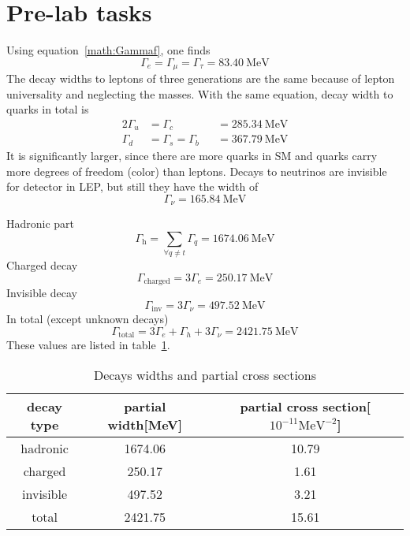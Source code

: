 \section{Pre-lab tasks}
Using equation~\ref{math:Gammaf}, one finds
\begin{equation}
	\Gamma_e = \Gamma_\mu = \Gamma_\tau = \SI{83.40}{\mega\eV}
\end{equation}
The decay widths to leptons of three generations are the same because of lepton universality and neglecting the masses. With the same equation, decay width to quarks in total is
\begin{alignat*}{2}
	\Gamma_u &= \Gamma_c &&= \SI{285.34}{\mega\eV} \\
	\Gamma_d &= \Gamma_s = \Gamma_b &&= \SI{367.79}{\mega\eV}
\end{alignat*}
It is significantly larger, since there are more quarks in SM and quarks carry more degrees of freedom (color) than leptons. Decays to neutrinos are invisible for detector in LEP, but still they have the width of
\begin{equation}
	\Gamma_{\nu} = \SI{165.84}{\mega\eV}
	\label{math:Gammanu}
\end{equation}

Hadronic part
\begin{equation}
	\Gamma_\text{h} = \sum_{\forall q\neq t} \Gamma_q = \SI{1674.06}{\mega\eV}
\end{equation}
Charged decay
\begin{equation}
	\Gamma_\text{charged} = 3 \Gamma_e = \SI{250.17}{\mega\eV}
\end{equation}
Invisible decay
\begin{equation}
	\Gamma_\text{inv} = 3\Gamma_\nu = \SI{497.52}{\mega\eV}
\end{equation}
In total (except unknown decays)
\begin{equation}
	\Gamma_\text{total} = 3\Gamma_e + \Gamma_h + 3\Gamma_\nu = \SI{2421.75}{\mega\eV}
\end{equation}
These values are listed in table~\ref{tab:p_cross_theo}.
\begin{table}[ht]
	\centering
	\begin{tabular}{ccc}
		\toprule
		decay type & partial width[\si{\mega\eV}]  & partial cross section[$10^{-11}\si{\mega\eV\tothe{-2}}$] 	 \\
		\midrule
		hadronic & \num{1674.06} & \num{10.79} \\
		charged & \num{250.17} & \num{1.61} \\
		invisible & \num{497.52} & \num{3.21}  \\
		total & \num{2421.75} & \num{15.61} \\
		\bottomrule
	\end{tabular}
	\caption{Decays widths and partial cross sections\label{tab:p_cross_theo}}
\end{table}


